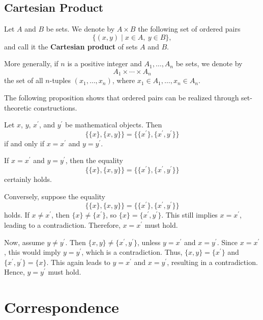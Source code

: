 \documentclass{book}
\numberwithin{equation}{section}
\begin{document}
\section{Cartesian Product}

\begin{definitionenv}
Let \(A\) and \(B\) be sets. We denote by \(A \times B\) the following set of ordered pairs
\[
\{(x, y) \mid x \in A,\ y \in B\},
\]
and call it the \textbf{Cartesian product} of sets \(A\) and \(B\).

More generally, if \(n\) is a positive integer and \(A_1, \ldots, A_n\) be sets, we denote by
\[
A_1 \times \cdots \times A_n
\]
the set of all \(n\)-tuples \((x_1, \ldots, x_n)\), where \(x_1 \in A_1, \ldots, x_n \in A_n\).
\end{definitionenv}

The following proposition shows that ordered pairs can be realized through set-theoretic constructions.

\begin{propositionenv}
Let \(x\), \(y\), \(x^{\prime}\), and \(y^{\prime}\) be mathematical objects. Then
\[
\{\{x\},\{x,y\}\}=\{\{x^{\prime}\},\{x^{\prime},y^{\prime}\}\}
\]
if and only if \(x=x^{\prime}\) and \(y=y^{\prime}\).
\end{propositionenv}

\begin{proofenv}
If \(x=x^{\prime}\) and \(y=y^{\prime}\), then the equality
\[
\{\{x\},\{x,y\}\}=\{\{x^{\prime}\},\{x^{\prime},y^{\prime}\}\}
\]
certainly holds.

Conversely, suppose the equality
\[
\{\{x\},\{x,y\}\}=\{\{x^{\prime}\},\{x^{\prime},y^{\prime}\}\}
\]
holds. If \(x\neq x^{\prime}\), then \(\{x\}\neq\{x^{\prime}\}\), so \(\{x\}=\{x^{\prime},y^{\prime}\}\). This still implies \(x=x^{\prime}\), leading to a contradiction. Therefore, \(x=x^{\prime}\) must hold.

Now, assume \(y\neq y^{\prime}\). Then \(\{x,y\}\neq\{x^{\prime},y^{\prime}\}\), unless \(y=x^{\prime}\) and \(x=y^{\prime}\). Since \(x=x^{\prime}\), this would imply \(y=y^{\prime}\), which is a contradiction. Thus, \(\{x,y\}=\{x^{\prime}\}\) and \(\{x^{\prime},y^{\prime}\}=\{x\}\). This again leads to \(y=x^{\prime}\) and \(x=y^{\prime}\), resulting in a contradiction. Hence, \(y=y^{\prime}\) must hold.
\end{proofenv}

\chapter{Correspondence}
\end{document}
